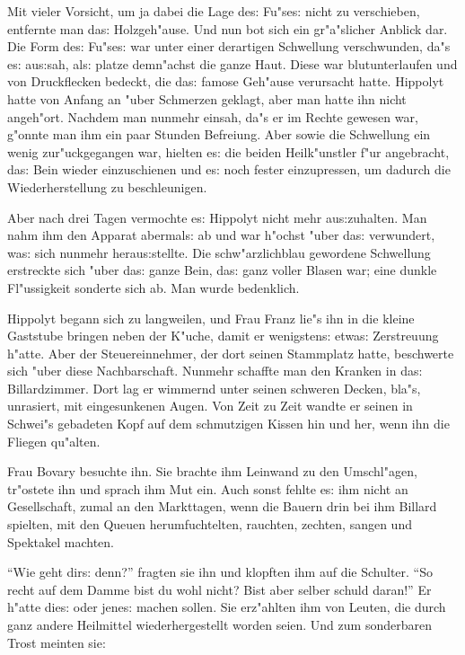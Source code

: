 \documentclass[oneside,12pt]{book}
\newcommand{\s}{s:}%
\begin{document}
Mit vieler Vorsicht, um ja dabei die Lage de{\s} Fu"se{\s} nicht
zu verschieben, entfernte man da{\s} Holzgeh"ause. Und nun bot
sich ein gr"a"slicher Anblick dar. Die Form de{\s} Fu"se{\s} war
unter einer derartigen Schwellung verschwunden, da"s e{\s}
au{\s}sah, al{\s} platze demn"achst die ganze Haut. Diese war
blutunterlaufen und von Druckflecken bedeckt, die da{\s} famose
Geh"ause verursacht hatte. Hippolyt hatte von Anfang an "uber
Schmerzen geklagt, aber man hatte ihn nicht angeh"ort. Nachdem man
nunmehr einsah, da"s er im Rechte gewesen war, g"onnte man ihm ein
paar Stunden Befreiung. Aber sowie die Schwellung ein wenig
zur"uckgegangen war, hielten e{\s} die beiden Heilk"unstler f"ur
angebracht, da{\s} Bein wieder einzuschienen und e{\s} noch fester
einzupressen, um dadurch die Wiederherstellung zu beschleunigen.

Aber nach drei Tagen vermochte e{\s} Hippolyt nicht mehr
au{\s}zuhalten. Man nahm ihm den Apparat abermal{\s} ab und war
h"ochst "uber da{\s} verwundert, wa{\s} sich nunmehr
herau{\s}stellte. Die schw"arzlichblau gewordene Schwellung
erstreckte sich "uber da{\s} ganze Bein, da{\s} ganz voller Blasen
war; eine dunkle Fl"ussigkeit sonderte sich ab. Man wurde
bedenklich.

Hippolyt begann sich zu langweilen, und Frau Franz lie"s ihn in
die kleine Gaststube bringen neben der K"uche, damit er
wenigsten{\s} etwa{\s} Zerstreuung h"atte. Aber der Steuereinnehmer,
der dort seinen Stammplatz hatte, beschwerte sich "uber diese
Nachbarschaft. Nunmehr schaffte man den Kranken in da{\s}
Billardzimmer. Dort lag er wimmernd unter seinen schweren Decken,
bla"s, unrasiert, mit eingesunkenen Augen. Von Zeit zu Zeit wandte
er seinen in Schwei"s gebadeten Kopf auf dem schmutzigen Kissen
hin und her, wenn ihn die Fliegen qu"alten.

Frau Bovary besuchte ihn. Sie brachte ihm Leinwand zu den
Umschl"agen, tr"ostete ihn und sprach ihm Mut ein. Auch sonst
fehlte e{\s} ihm nicht an Gesellschaft, zumal an den Markttagen,
wenn die Bauern drin bei ihm Billard spielten, mit den Queuen
herumfuchtelten, rauchten, zechten, sangen und Spektakel machten.

"`Wie geht dir{\s} denn?"' fragten sie ihn und klopften ihm auf
die Schulter. "`So recht auf dem Damme bist du wohl nicht? Bist
aber selber schuld daran!"' Er h"atte die{\s} oder jene{\s} machen
sollen. Sie erz"ahlten ihm von Leuten, die durch ganz andere
Heilmittel wiederhergestellt worden seien. Und zum sonderbaren
Trost meinten sie:
\end{document}
